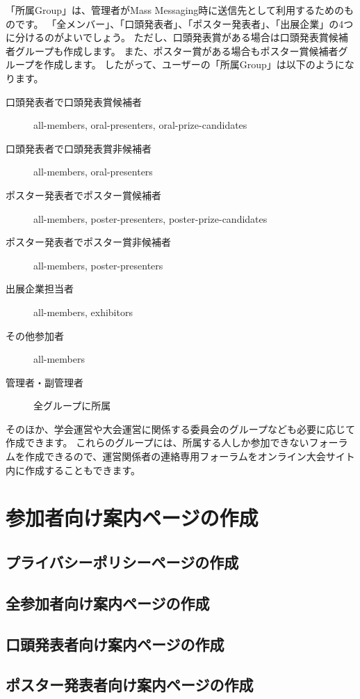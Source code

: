 \documentclass[titlepage,10pt,a4paper,uplatex]{jsbook}
\begin{document}
「所属Group」は、管理者がMass Messaging時に送信先として利用するためのものです。
「全メンバー」、「口頭発表者」、「ポスター発表者」、「出展企業」の4つに分けるのがよいでしょう。
ただし、口頭発表賞がある場合は口頭発表賞候補者グループも作成します。
また、ポスター賞がある場合もポスター賞候補者グループを作成します。
したがって、ユーザーの「所属Group」は以下のようになります。

\begin{description}
\item[口頭発表者で口頭発表賞候補者] all-members, oral-presenters, oral-prize-candidates
\item[口頭発表者で口頭発表賞非候補者] all-members, oral-presenters
\item[ポスター発表者でポスター賞候補者] all-members, poster-presenters, poster-prize-candidates
\item[ポスター発表者でポスター賞非候補者] all-members, poster-presenters
\item[出展企業担当者] all-members, exhibitors
\item[その他参加者] all-members
\item[管理者・副管理者] 全グループに所属
\end{description}

そのほか、学会運営や大会運営に関係する委員会のグループなども必要に応じて作成できます。
これらのグループには、所属する人しか参加できないフォーラムを作成できるので、運営関係者の連絡専用フォーラムをオンライン大会サイト内に作成することもできます。

\section{参加者向け案内ページの作成}

\subsection{プライバシーポリシーページの作成}

\subsection{全参加者向け案内ページの作成}

\subsection{口頭発表者向け案内ページの作成}

\subsection{ポスター発表者向け案内ページの作成}
\end{document}
